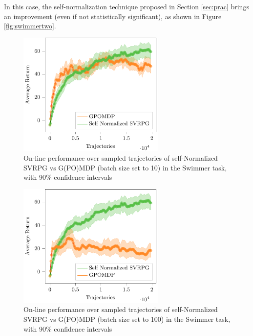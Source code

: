  In this case, the self-normalization technique proposed in Section \ref{sec:prac} brings an improvement (even if not statistically significant), as shown in Figure \ref{fig:swimmertwo}.
\begin{figure}[h]
	\begin{minipage}[h]{1\textwidth}
		\centering
		\includegraphics[width=0.65\textwidth]{Images/Experiments/swimmer_self_normalized_SVRPG_vs_GPOMDP_tex.pdf}
		\vspace{-0.1in}
		\caption{On-line performance over sampled trajectories of self-Normalized \acs{SVRPG} vs G(PO)MDP (batch size set to 10) in the Swimmer task, with 90\% confidence intervals}
		\label{fig:swimmerone}
	\end{minipage}
	\vspace{-0.15in}
\end{figure}
\begin{figure}[h]
	\begin{minipage}[h]{1\textwidth}
		\centering
		\includegraphics[width=0.65\textwidth]{Images/Experiments/swimmer_GPOMDP_100_vs_SN_SVRPG.pdf}
		\vspace{-0.1in}
		\caption{On-line performance over sampled trajectories of self-Normalized \acs{SVRPG} vs G(PO)MDP (batch size set to 100) in the Swimmer task, with 90\% confidence intervals}
		\label{fig:swimmer100}
	\end{minipage}
	\vspace{-0.15in}
\end{figure}
